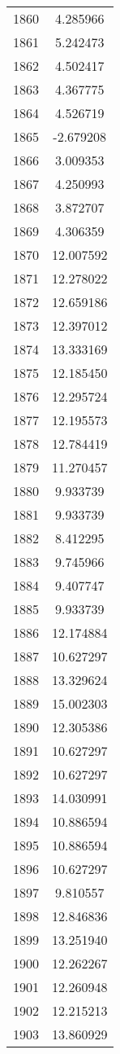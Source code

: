 \documentclass[12pt]{article}
\begin{document}
\begin{longtable}{@{}cc@{}}
1860 & 4.285966 \\
1861 & 5.242473 \\
1862 & 4.502417 \\
1863 & 4.367775 \\
1864 & 4.526719 \\
1865 & -2.679208 \\
1866 & 3.009353 \\
1867 & 4.250993 \\
1868 & 3.872707 \\
1869 & 4.306359 \\
1870 & 12.007592 \\
1871 & 12.278022 \\
1872 & 12.659186 \\
1873 & 12.397012 \\
1874 & 13.333169 \\
1875 & 12.185450 \\
1876 & 12.295724 \\
1877 & 12.195573 \\
1878 & 12.784419 \\
1879 & 11.270457 \\
1880 & 9.933739 \\
1881 & 9.933739 \\
1882 & 8.412295 \\
1883 & 9.745966 \\
1884 & 9.407747 \\
1885 & 9.933739 \\
1886 & 12.174884 \\
1887 & 10.627297 \\
1888 & 13.329624 \\
1889 & 15.002303 \\
1890 & 12.305386 \\
1891 & 10.627297 \\
1892 & 10.627297 \\
1893 & 14.030991 \\
1894 & 10.886594 \\
1895 & 10.886594 \\
1896 & 10.627297 \\
1897 & 9.810557 \\
1898 & 12.846836 \\
1899 & 13.251940 \\
1900 & 12.262267 \\
1901 & 12.260948 \\
1902 & 12.215213 \\
1903 & 13.860929 \\

\end{longtable}
\end{document}
